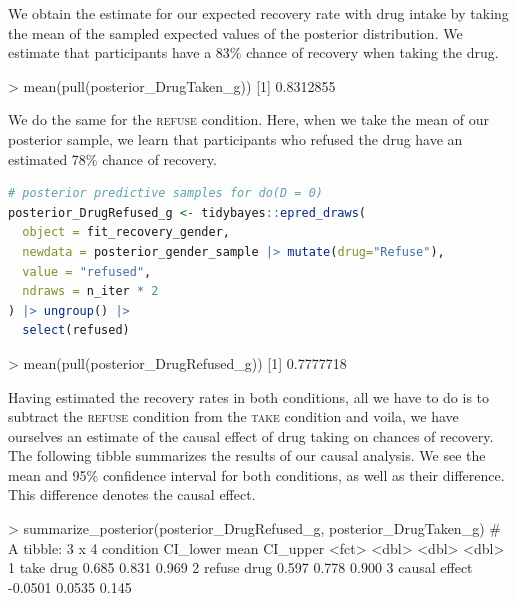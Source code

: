 \documentclass[nobib]{tufte-handout}
\begin{document}
\vspace{-0.5cm}
We obtain the estimate for our expected recovery rate with drug intake by taking the mean of the sampled expected values of the posterior distribution. 
We estimate that participants have a 83\% chance of recovery when taking the drug.

\begin{minipage}[]{\textwidth}
\begin{rc}
> mean(pull(posterior_DrugTaken_g))
[1] 0.8312855
\end{rc}
\end{minipage}

\vspace{-0.5cm}
We do the same for the \textsc{refuse} condition. 
Here, when we take the mean of our posterior sample, we learn that participants who refused the drug have an estimated 78\% chance of recovery. 

\begin{minipage}[]{\textwidth}
\begin{lstlisting}[language=R]
# posterior predictive samples for do(D = 0)
posterior_DrugRefused_g <- tidybayes::epred_draws(
  object = fit_recovery_gender,
  newdata = posterior_gender_sample |> mutate(drug="Refuse"),
  value = "refused",
  ndraws = n_iter * 2
) |> ungroup() |>
  select(refused)
\end{lstlisting}
\end{minipage}

\vspace{-0.5cm}

\begin{minipage}[]{\textwidth}
\begin{rc}
> mean(pull(posterior_DrugRefused_g))
[1] 0.7777718
\end{rc}
\end{minipage}

\vspace{-0.5cm}
Having estimated the recovery rates in both conditions, all we have to do is to subtract the \textsc{refuse} condition from the \textsc{take} condition and voila, we have ourselves an estimate of the causal effect of drug taking on chances of recovery. 
The following tibble summarizes the results of our causal analysis. 
We see the mean and 95\% confidence interval for both conditions, as well as their difference. 
This difference denotes the causal effect. 

\begin{minipage}[]{\textwidth}
\begin{rc}
> summarize_posterior(posterior_DrugRefused_g, posterior_DrugTaken_g)
# A tibble: 3 x 4
  condition     CI_lower   mean CI_upper
  <fct>            <dbl>  <dbl>    <dbl>
1 take drug       0.685  0.831     0.969
2 refuse drug     0.597  0.778     0.900
3 causal effect  -0.0501 0.0535    0.145
\end{rc}
\end{minipage}
\end{document}
